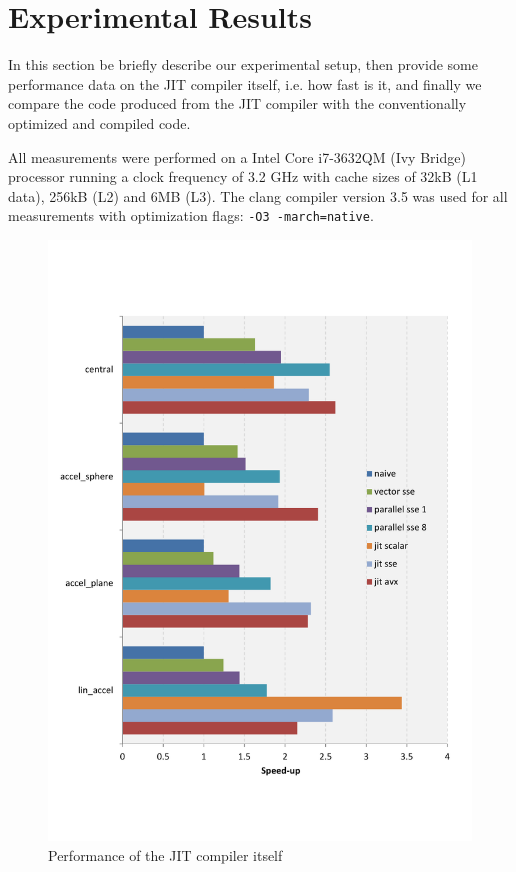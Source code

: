 \section{Experimental Results}\label{sec:exp}

In this section be briefly describe our experimental setup, then provide some performance data on the JIT compiler itself, i.e. how fast is it, and finally we compare the code produced from the JIT compiler with the conventionally optimized and compiled code.


All measurements were performed on a Intel Core i7-3632QM (Ivy Bridge) processor running a clock frequency of 3.2 GHz with cache sizes of 32kB (L1 data), 256kB (L2) and 6MB (L3). The clang compiler version 3.5 was used for all measurements with optimization flags: \texttt{-O3 -march=native}.



\begin{figure}\centering
  \includegraphics[scale=0.6]{single_dual_rules.pdf}
  \caption{Performance of the JIT compiler itself
  \label{perf_jit}}
\end{figure}


